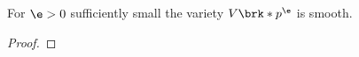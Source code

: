 \begin{proposition}
  For $\e>0$ sufficiently small the variety $V\brk*{p^\e}$ is smooth.
\end{proposition}
\begin{proof}
  

\end{proof}
